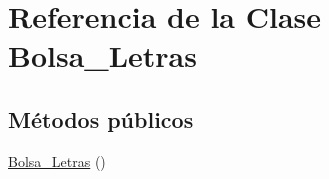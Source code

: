 \hypertarget{classBolsa__Letras}{}\section{Referencia de la Clase Bolsa\+\_\+\+Letras}
\label{classBolsa__Letras}
\subsection*{Métodos públicos}
\begin{DoxyCompactItemize}
\item 
\hyperlink{classBolsa__Letras_aac3edc3708e10d1decee5575a0cfd543}{Bolsa\+\_\+\+Letras} ()\hypertarget{classBolsa__Letras_aac3edc3708e10d1decee5575a0cfd543}{}\label{classBolsa__Letras_aac3edc3708e10d1decee5575a0cfd543}


\end{DoxyCompactItemize}
